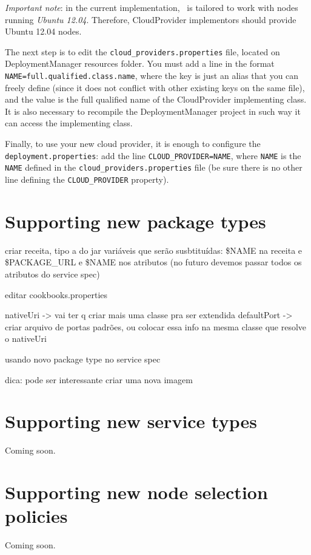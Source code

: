 \emph{Important note}: in the current implementation, \ee\ is tailored to work with nodes running \emph{Ubuntu 12.04}. Therefore, \textsf{CloudProvider} implementors should provide Ubuntu 12.04 nodes. 

The next step is to edit the \texttt{cloud\_providers.properties} file, located on DeploymentManager resources folder. You must add a line in the format \verb!NAME=full.qualified.class.name!, where the key is just an alias that you can freely define (since it does not conflict with other existing keys on the same file), and the value is the full qualified name of the \textsf{CloudProvider} implementing class. It is also necessary to recompile the DeploymentManager project in such way it can access the implementing class.

Finally, to use your new cloud provider, it is enough to configure the \texttt{deployment.properties}: add the line \verb!CLOUD_PROVIDER=NAME!, where \verb!NAME! is the \verb!NAME! defined in the \texttt{cloud\_providers.properties} file (be sure there is no other line defining the \verb!CLOUD_PROVIDER! property).

\section{Supporting new package types}

criar receita, tipo a do jar
variáveis que serão susbtituídas:
\$NAME na receita
e \$PACKAGE\_URL e \$NAME nos atributos
(no futuro devemos passar todos os atributos do service spec)

editar cookbooks.properties

nativeUri -> vai ter q criar mais uma classe pra ser extendida
defaultPort -> criar arquivo de portas padrões, ou colocar essa info 
na mesma classe que resolve o nativeUri

usando novo package type no service spec

dica: pode ser interessante criar uma nova imagem


\section{Supporting new service types}

Coming soon.

\section{Supporting new node selection policies}

Coming soon.
